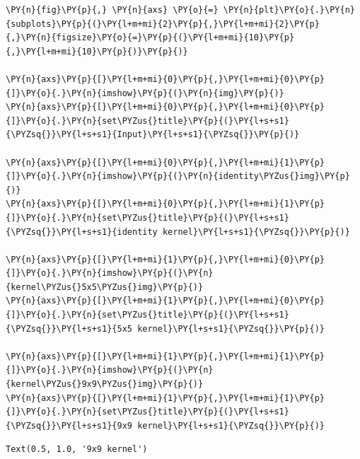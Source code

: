 \begin{tcolorbox}[breakable, size=fbox, boxrule=1pt, pad at break*=1mm,colback=cellbackground, colframe=cellborder]
	\begin{Verbatim}[commandchars=\\\{\}]
\PY{n}{fig}\PY{p}{,} \PY{n}{axs} \PY{o}{=} \PY{n}{plt}\PY{o}{.}\PY{n}{subplots}\PY{p}{(}\PY{l+m+mi}{2}\PY{p}{,}\PY{l+m+mi}{2}\PY{p}{,}\PY{n}{figsize}\PY{o}{=}\PY{p}{(}\PY{l+m+mi}{10}\PY{p}{,}\PY{l+m+mi}{10}\PY{p}{)}\PY{p}{)}

\PY{n}{axs}\PY{p}{[}\PY{l+m+mi}{0}\PY{p}{,}\PY{l+m+mi}{0}\PY{p}{]}\PY{o}{.}\PY{n}{imshow}\PY{p}{(}\PY{n}{img}\PY{p}{)}
\PY{n}{axs}\PY{p}{[}\PY{l+m+mi}{0}\PY{p}{,}\PY{l+m+mi}{0}\PY{p}{]}\PY{o}{.}\PY{n}{set\PYZus{}title}\PY{p}{(}\PY{l+s+s1}{\PYZsq{}}\PY{l+s+s1}{Input}\PY{l+s+s1}{\PYZsq{}}\PY{p}{)}

\PY{n}{axs}\PY{p}{[}\PY{l+m+mi}{0}\PY{p}{,}\PY{l+m+mi}{1}\PY{p}{]}\PY{o}{.}\PY{n}{imshow}\PY{p}{(}\PY{n}{identity\PYZus{}img}\PY{p}{)}
\PY{n}{axs}\PY{p}{[}\PY{l+m+mi}{0}\PY{p}{,}\PY{l+m+mi}{1}\PY{p}{]}\PY{o}{.}\PY{n}{set\PYZus{}title}\PY{p}{(}\PY{l+s+s1}{\PYZsq{}}\PY{l+s+s1}{identity kernel}\PY{l+s+s1}{\PYZsq{}}\PY{p}{)}

\PY{n}{axs}\PY{p}{[}\PY{l+m+mi}{1}\PY{p}{,}\PY{l+m+mi}{0}\PY{p}{]}\PY{o}{.}\PY{n}{imshow}\PY{p}{(}\PY{n}{kernel\PYZus{}5x5\PYZus{}img}\PY{p}{)}
\PY{n}{axs}\PY{p}{[}\PY{l+m+mi}{1}\PY{p}{,}\PY{l+m+mi}{0}\PY{p}{]}\PY{o}{.}\PY{n}{set\PYZus{}title}\PY{p}{(}\PY{l+s+s1}{\PYZsq{}}\PY{l+s+s1}{5x5 kernel}\PY{l+s+s1}{\PYZsq{}}\PY{p}{)}

\PY{n}{axs}\PY{p}{[}\PY{l+m+mi}{1}\PY{p}{,}\PY{l+m+mi}{1}\PY{p}{]}\PY{o}{.}\PY{n}{imshow}\PY{p}{(}\PY{n}{kernel\PYZus{}9x9\PYZus{}img}\PY{p}{)}
\PY{n}{axs}\PY{p}{[}\PY{l+m+mi}{1}\PY{p}{,}\PY{l+m+mi}{1}\PY{p}{]}\PY{o}{.}\PY{n}{set\PYZus{}title}\PY{p}{(}\PY{l+s+s1}{\PYZsq{}}\PY{l+s+s1}{9x9 kernel}\PY{l+s+s1}{\PYZsq{}}\PY{p}{)}
	\end{Verbatim}
\end{tcolorbox}

\begin{tcolorbox}[breakable, size=fbox, boxrule=.5pt, pad at break*=1mm, opacityfill=0]
	\begin{Verbatim}[commandchars=\\\{\}]
Text(0.5, 1.0, '9x9 kernel')
	\end{Verbatim}
\end{tcolorbox}

\begin{center}
\end{center}
{ \hspace*{\fill} \\}

